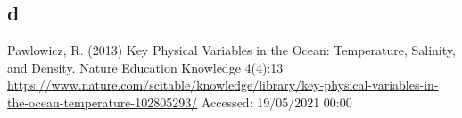\documentclass[11pt]{article}
\numberwithin{equation}{section}
\begin{document}
\subsection{d}

\begin{thebibliography}{00}
     Pawlowicz, R. (2013) Key Physical Variables in the Ocean: Temperature, Salinity, and Density. Nature Education Knowledge 4(4):13 \url{https://www.nature.com/scitable/knowledge/library/key-physical-variables-in-the-ocean-temperature-102805293/} Accessed: 19/05/2021 00:00
\end{thebibliography}
\end{document}
